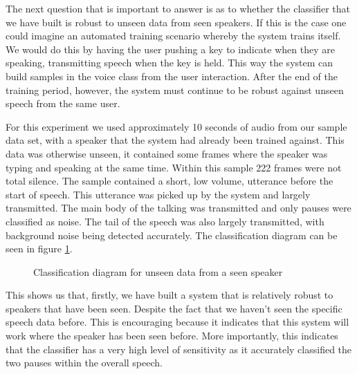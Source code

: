 \documentclass[ %
                    author={Sam Phippen},
                supervisor={Dr. Rafal Bogacz},
                     title={Real time voice activity detectors in noisy personal computing environments},
                  subtitle={},
                    degree={MEng},
                      year={2012} ]{thesis}
\begin{document}
The next question that is important to answer is as to whether the classifier
that we have built is robust to unseen data from seen speakers. If this is the
case one could imagine an automated training scenario whereby the system trains
itself. We would do this by having the user pushing a key to indicate when they
are speaking, transmitting speech when the key is held. This way the system can
build samples in the voice class from the user interaction. After the end of
the training period, however, the system must continue to be robust against
unseen speech from the same user.

For this experiment we used approximately 10 seconds of audio from our sample
data set, with a speaker that the system had already been trained against. This
data was otherwise unseen, it contained some frames where the speaker was
typing and speaking at the same time. Within this sample 222 frames were not
total silence. The sample contained a short, low volume, utterance before the
start of speech. This utterance was picked up by the system and largely
transmitted. The main body of the talking was transmitted and only pauses were
classified as noise. The tail of the speech was also largely transmitted, with
background noise being detected accurately. The classification diagram can be
seen in figure \ref{fig:ultimation}.

\begin{figure}
    \caption{Classification diagram for unseen data from a seen speaker}
    \label{fig:ultimation}
\end{figure}

This shows us that, firstly, we have built a system that is relatively robust
to speakers that have been seen. Despite the fact that we haven't seen the
specific speech data before. This is encouraging because it indicates that this
system will work where the speaker has been seen before. More importantly, this
indicates that the classifier has a very high level of sensitivity as it
accurately classified the two pauses within the overall speech.
\end{document}
